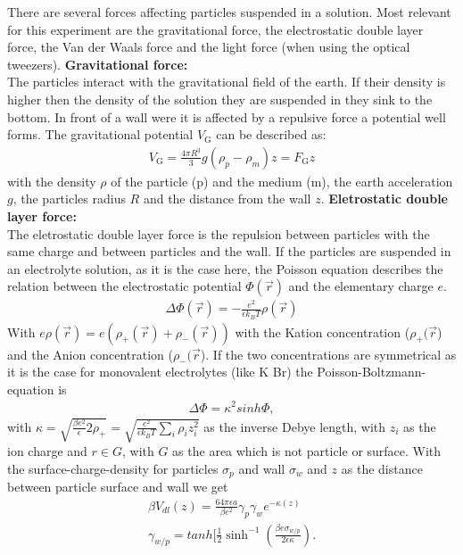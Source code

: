 \documentclass[.../bericht]{subfilies}
\begin{document}
        There are several forces affecting particles suspended in a solution. Most relevant for this experiment are the gravitational force, the electrostatic double layer force, the Van der Waals force and the light force (when using the optical tweezers).
        \textbf{Gravitational force:}\\
        The particles interact with the gravitational field of the earth. If their density is higher then the density of the solution they are suspended in they sink to the bottom. In front of a wall were it is affected by a repulsive force a potential well forms.  The gravitational potential $V_\mathrm{G}$ can be described as:
        \begin{align}
          V_\mathrm{G}=\frac{4\pi R^3}{3}g(\rho_p-\rho_m)z=F_\mathrm{G}z
        \end{align}
        with the density $\rho$ of the particle (p) and the medium (m), the earth acceleration $g$, the particles radius $R$ and the distance from the wall $z$.
        \textbf{Eletrostatic double layer force:}\\
        The eletrostatic double layer force is the repulsion between particles with the same charge and between particles and the wall. If the particles are suspended in an electrolyte solution, as it is the case here, the Poisson equation describes the relation between the electrostatic potential $\Phi (\overrightarrow{r})$ and the elementary charge $e$.
        \begin{align}
          \Delta \Phi (\overrightarrow{r})=-\frac{e^2}{\epsilon k_B T}\rho(\overrightarrow{r})
        \end{align}
        With $e\rho(\overrightarrow{r})=e(\rho_+(\overrightarrow{r})+\rho_-(\overrightarrow{r}))$ with the Kation concentration ($\rho_+(\overrightarrow{r}$) and the Anion concentration ($\rho_-(\overrightarrow{r}$). If the two concentrations are symmetrical as it is the case for monovalent electrolytes (like K Br) the Poisson-Boltzmann-equation is
        \begin{align}
          \Delta \Phi= \kappa^2sinh\Phi,
        \end{align}
        with $\kappa=\sqrt{\frac{\beta e^2}{\epsilon}2\rho_+}=\sqrt{\frac{e^2}{\epsilon k_B T}\sum_i \rho_i z_i^2}$ as the inverse Debye length, with $z_i$ as the ion charge and $r\in G$, with $G$ as the area which is not particle or surface. With the surface-charge-density for particles $\sigma_p$ and wall $\sigma_w$ and $z$ as the distance between particle surface and wall we get
        \begin{align}
          \beta V_{dl}(z)=\frac{64\pi \epsilon a}{\beta e^2} \gamma_p \gamma_w e^{-\kappa(z)} \\
          \gamma_{w/p}=tanh[\frac{1}{2}\sinh^{-1} \left(\frac{\beta e \sigma_{w/p}}{2\epsilon \kappa}\right).
        \end{align}
\end{document}
